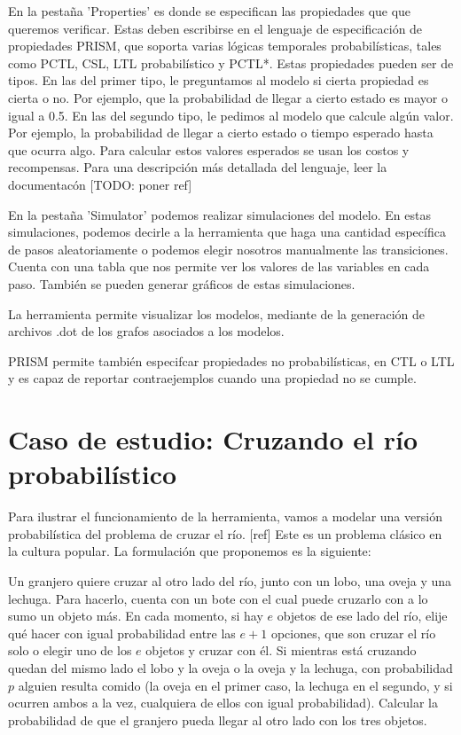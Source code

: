 \documentclass[runningheads]{llncs}
\begin{document}
En la pestaña 'Properties' es donde se especifican las propiedades que que queremos verificar. Estas deben escribirse en el lenguaje de especificación de propiedades PRISM, que soporta varias lógicas temporales probabilísticas, tales como PCTL, CSL, LTL probabilístico y PCTL*. Estas propiedades pueden ser de tipos. En las del primer tipo, le preguntamos al modelo si cierta propiedad es cierta o no. Por ejemplo, que la probabilidad de llegar a cierto estado es mayor o igual a 0.5. En las del segundo tipo, le pedimos al modelo que calcule algún valor. Por ejemplo, la probabilidad de llegar a cierto estado o tiempo esperado hasta que ocurra algo. Para calcular estos valores esperados se usan los costos y recompensas.
Para una descripción más detallada del lenguaje, leer la documentacón [TODO: poner ref]

En la pestaña 'Simulator' podemos realizar simulaciones del modelo. En estas simulaciones, podemos decirle a la herramienta que haga una cantidad específica de pasos aleatoriamente o podemos elegir nosotros manualmente las transiciones. Cuenta con una tabla que nos permite ver los valores de las variables en cada paso. También se pueden generar gráficos de estas simulaciones.

La herramienta permite visualizar los modelos, mediante de la generación de archivos .dot de los grafos asociados a los modelos.

PRISM permite también especifcar propiedades no probabilísticas, en CTL o LTL y es capaz de reportar contraejemplos cuando una propiedad no se cumple.

\section{Caso de estudio: Cruzando el río probabilístico}

Para ilustrar el funcionamiento de la herramienta, vamos a modelar una versión probabilística del problema de cruzar el río. [ref] Este es un problema clásico en la cultura popular. La formulación que proponemos es la siguiente:

Un granjero quiere cruzar al otro lado del río, junto con un lobo, una oveja y una lechuga. Para hacerlo, cuenta con un bote con el cual puede cruzarlo con a lo sumo un objeto más. En cada momento, si hay $e$ objetos de ese lado del río, elije qué hacer con igual probabilidad entre las $e+1$ opciones, que son cruzar el río solo o elegir uno de los $e$ objetos y cruzar con él. Si mientras está cruzando quedan del mismo lado el lobo y la oveja o la oveja y la lechuga, con probabilidad $p$ alguien resulta comido (la oveja en el primer caso, la lechuga en el segundo, y si ocurren ambos a la vez, cualquiera de ellos con igual probabilidad). Calcular la probabilidad de que el granjero pueda llegar al otro lado con los tres objetos.
\end{document}
